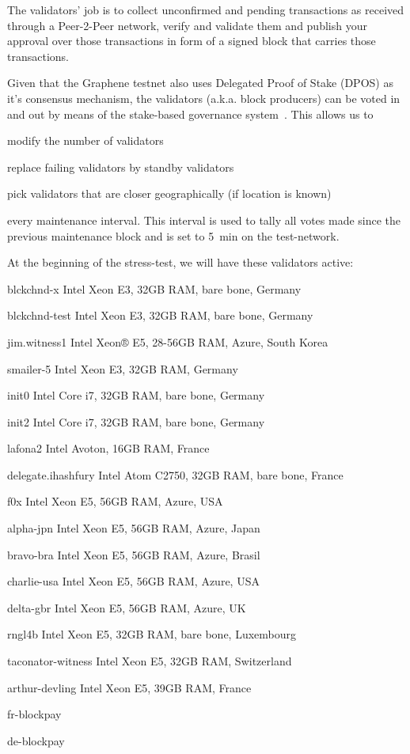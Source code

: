 The validators' job is to collect unconfirmed and pending transactions as
received through a Peer-2-Peer network, verify and validate them and publish
your approval over those transactions in form of a signed block that carries
those transactions.

Given that the Graphene testnet also uses Delegated Proof of Stake (DPOS) as
it's consensus mechanism, the validators (a.k.a. block producers) can be voted
in and out by means of the stake-based governance system~\cite{bts:general}.
This allows us to 
\begin{inparaenum}
 \item modify the number of validators
 \item replace failing validators by standby validators
 \item pick validators that are closer geographically (if location is known)
\end{inparaenum}
every maintenance interval. This interval is used to tally all votes made
since the previous maintenance block and is set to \SI{5}{min} on the
test-network.

At the beginning of the stress-test, we will have these validators active:

\begin{compactdesc}
 \item[blckchnd-x] Intel Xeon E3, 32GB RAM, bare bone, Germany
 \item[blckchnd-test] Intel Xeon E3, 32GB RAM, bare bone, Germany
 \item[jim.witness1] Intel Xeon® E5, 28-56GB RAM, Azure, South Korea
 \item[smailer-5]  Intel Xeon E3, 32GB RAM, Germany
 \item[init0] Intel Core i7, 32GB RAM, bare bone, Germany
 \item[init2] Intel Core i7, 32GB RAM, bare bone, Germany
 \item[lafona2] Intel Avoton, 16GB RAM, France
 \item[delegate.ihashfury] Intel Atom C2750, 32GB RAM, bare bone, France
 \item[f0x] Intel Xeon E5, 56GB RAM, Azure, USA
 \item[alpha-jpn] Intel Xeon E5, 56GB RAM, Azure, Japan
 \item[bravo-bra] Intel Xeon E5, 56GB RAM, Azure, Brasil
 \item[charlie-usa] Intel Xeon E5, 56GB RAM, Azure, USA
 \item[delta-gbr] Intel Xeon E5, 56GB RAM, Azure, UK
 \item[rngl4b] Intel Xeon E5, 32GB RAM, bare bone, Luxembourg
 \item[taconator-witness] Intel Xeon E5, 32GB RAM, Switzerland
 \item[arthur-devling] Intel Xeon E5, 39GB RAM, France
 \item[fr-blockpay] 
 \item[de-blockpay] 
\end{compactdesc}
